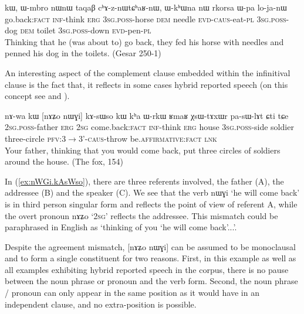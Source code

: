 \documentclass[oldfontcommands,oneside,a4paper,11pt]{article}
\newcommand{\ipa}[1]{{\phon \mbox{#1}}} %
\newcommand{\refb}[1]{(\ref{#1})}
\begin{document}
  \begin{exe}
\ex \label{ex:nWCe.kAsWso}
\gll 
[\ipa{nɯɕe}]  	\ipa{kɤ-sɯso}  	\ipa{kɯ,}  	\ipa{ɯ-mbro}  	\ipa{nɯnɯ}  	\ipa{taqaβ}  	\ipa{cʰɤ-z-nɯtɕʰaʁ-nɯ,}  	\ipa{ɯ-kʰɯna}  	\ipa{nɯ}  	\ipa{rkorsa}  	\ipa{ɯ-pa}  	\ipa{lo-ja-nɯ}  \\
go.back:\textsc{fact} \textsc{inf}-think \textsc{erg} \textsc{3sg.poss}-horse \textsc{dem} needle \textsc{evd-caus}-eat-\textsc{pl}   \textsc{3sg.poss}-dog \textsc{dem} toilet \textsc{3sg.poss}-down \textsc{evd}-pen-\textsc{pl} \\
\glt Thinking that he (was about to) go back, they fed his horse with needles and penned his dog in the toilets. (Gesar 250-1)
 \end{exe}
 
An interesting aspect  of the complement clause embedded within the infinitival clause is the fact that,  it reflects in some cases hybrid reported speech (on this concept see \citealt{tournadre08conjunct} and \citealt{aikhenvald08semidirect}).
 
  \begin{exe}
\ex \label{ex:nWGi.kAsWso}
\gll 
\ipa{nɤ-wa}  	\ipa{kɯ}  	[\ipa{nɤʑo}  	\ipa{nɯɣi}]  	\ipa{kɤ-sɯso}  	\ipa{kɯ}  	\ipa{kʰa}  	\ipa{ɯ-rkɯ}  	\ipa{ʁmaʁ}  	\ipa{χsɯ-tɤxɯr}  	\ipa{pa-sɯ-lɤt}  	\ipa{ɕti}  	\ipa{tɕe}  \\
\textsc{2sg.poss}-father \textsc{erg} \textsc{2sg} come.back:\textsc{fact}  \textsc{inf}-think \textsc{erg} house \textsc{3sg.poss}-side soldier three-circle \textsc{pfv:3$\rightarrow$3'-caus}-throw be.\textsc{affirmative}:\textsc{fact} \textsc{lnk}\\
\glt Your father, thinking that you would come back,   put three circles of soldiers around the house. (The fox, 154)

 \end{exe}
 
In \refb{ex:nWGi.kAsWso}, there are three referents involved, the father (A), the addressee (B) and the speaker (C). We see that the verb  	\ipa{nɯɣi} `he will come back' is in third person singular form and reflects the point of view of referent A, while the overt pronoun \ipa{nɤʑo} `\textsc{2sg}' reflects the addressee. This mismatch could be paraphrased in English as `thinking of you `he will come back'...'.  

Despite the agreement mismatch, [\ipa{nɤʑo}  	\ipa{nɯɣi}] can be assumed to be monoclausal and to form a single constituent for two reasons. First, in this example as well as all examples exhibiting   hybrid reported speech in the corpus, there is no  pause between the noun phrase or pronoun and the verb form. Second,  the noun phrase / pronoun can only appear in the same position as it would have in an independent clause, and no extra-position is possible. 
 
\end{document}
